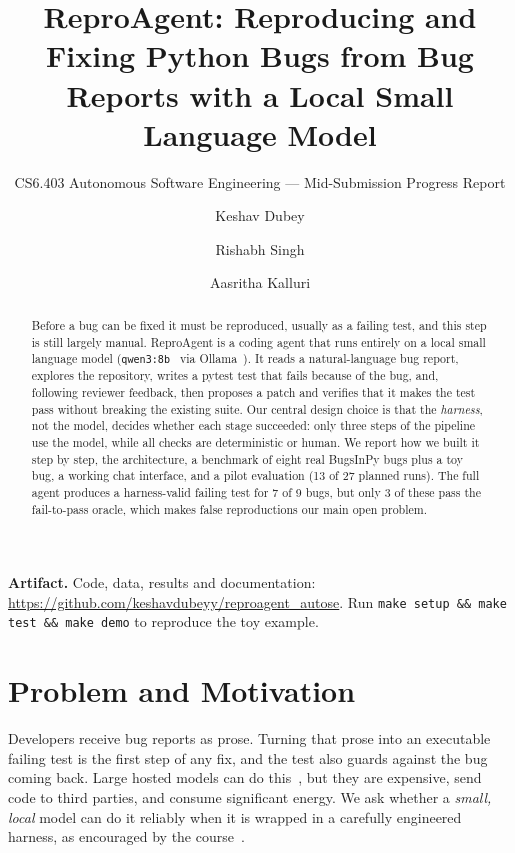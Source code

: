 \documentclass[manuscript,screen,nonacm]{acmart}
\newcommand{\repo}{https://github.com/keshavdubeyy/reproagent_autose}
\begin{document}
\title{ReproAgent: Reproducing and Fixing Python Bugs from Bug Reports with a Local Small Language Model}
\subtitle{CS6.403 Autonomous Software Engineering --- Mid-Submission Progress Report}

\author{Keshav Dubey}
\author{Rishabh Singh}
\author{Aasritha Kalluri}

\begin{abstract}
Before a bug can be fixed it must be reproduced, usually as a failing test, and this step is still largely manual.
ReproAgent is a coding agent that runs entirely on a local small language model (\texttt{qwen3:8b}~\cite{qwen3} via Ollama~\cite{ollama}).
It reads a natural-language bug report, explores the repository, writes a pytest test that fails because of the bug,
and, following reviewer feedback, then proposes a patch and verifies that it makes the test pass without breaking the existing suite.
Our central design choice is that the \emph{harness}, not the model, decides whether each stage succeeded:
only three steps of the pipeline use the model, while all checks are deterministic or human.
We report how we built it step by step, the architecture, a benchmark of eight real BugsInPy bugs plus a toy bug, a working chat interface,
and a pilot evaluation (13 of 27 planned runs). The full agent produces a harness-valid failing test for 7 of 9 bugs,
but only 3 of these pass the fail-to-pass oracle, which makes false reproductions our main open problem.
\end{abstract}

\maketitle

\noindent\textbf{Artifact.} Code, data, results and documentation: \url{\repo}.
Run \texttt{make setup \&\& make test \&\& make demo} to reproduce the toy example.

\section{Problem and Motivation}
Developers receive bug reports as prose. Turning that prose into an executable failing test is the first step of any fix,
and the test also guards against the bug coming back. Large hosted models can do this~\cite{libro}, but they are expensive, send code to third parties,
and consume significant energy. We ask whether a \emph{small, local} model can do it reliably when it is wrapped in a carefully engineered harness,
as encouraged by the course~\cite{course}.
\end{document}

